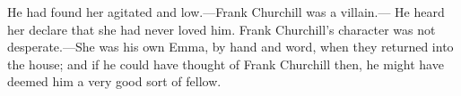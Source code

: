 He had found her agitated and low.—Frank Churchill was a villain.— He heard her declare that she had never loved him. Frank Churchill's character was not desperate.—She was his own Emma, by hand and word, when they returned into the house; and if he could have thought of Frank Churchill then, he might have deemed him a very good sort of fellow.